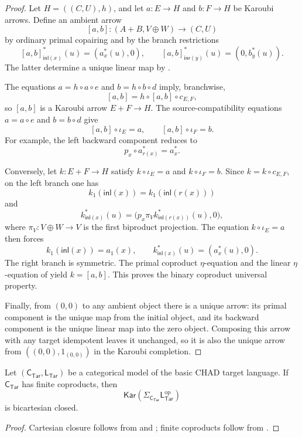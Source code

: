 \documentclass[runningheads,envcountsame]{llncs}
\newcommand{\Tar}{\mathsf{Tar}}
\newcommand{\CTar}{\mathsf C_{\Tar}}
\newcommand{\LTar}{\mathsf L_{\Tar}}
\newcommand{\Kar}{\mathsf{Kar}}
\begin{document}
\begin{proof}
Let $H=((C,U),h)$, and let $a:E\to H$ and $b:F\to H$ be Karoubi arrows.
Define an ambient arrow
$$
[a,b]:(A+B,V\oplus W)\longrightarrow(C,U)
$$
by ordinary primal copairing and by the branch restrictions
$$
[a,b]^*_{\mathsf{inl}(x)}(u)=(a_x^*(u),0),
\qquad
[a,b]^*_{\mathsf{inr}(y)}(u)=(0,b_y^*(u)).
$$
The latter determine a unique linear map by
.

The equations $a=h\circ a\circ e$ and $b=h\circ b\circ d$ imply,
branchwise,
$$
[a,b]=h\circ[a,b]\circ c_{E,F},
$$
so $[a,b]$ is a Karoubi arrow $E+F\to H$. The source-compatibility equations
$a=a\circ e$ and $b=b\circ d$ give
$$
[a,b]\circ\iota_E=a,
\qquad
[a,b]\circ\iota_F=b.
$$
For example, the left backward component reduces to
$$
p_x\circ a^*_{r(x)}=a_x^*.
$$

Conversely, let $k:E+F\to H$ satisfy
$k\circ\iota_E=a$ and $k\circ\iota_F=b$. Since
$k=k\circ c_{E,F}$, on the left branch one has
$$
k_1(\mathsf{inl}(x))
=
k_1(\mathsf{inl}(r(x)))
$$
and
$$
k^*_{\mathsf{inl}(x)}(u)
=
\bigl(p_x\pi_Vk^*_{\mathsf{inl}(r(x))}(u),0\bigr),
$$
where $\pi_V:V\oplus W\to V$ is the first biproduct projection. The
equation $k\circ\iota_E=a$ then forces
$$
k_1(\mathsf{inl}(x))=a_1(x),
\qquad
k^*_{\mathsf{inl}(x)}(u)=(a_x^*(u),0).
$$
The right branch is symmetric. The primal coproduct $\eta$-equation and the
linear $\eta$-equation of  yield
$k=[a,b]$. This proves the binary coproduct universal property.

Finally, from $(0,0)$ to any ambient object there is a unique arrow: its primal
component is the unique map from the initial object, and its backward component
is the unique linear map into the zero object. Composing this arrow with any
target idempotent leaves it unchanged, so it is also the unique arrow from
$((0,0),1_{(0,0)})$ in the Karoubi completion.
\end{proof}

\begin{corollary}
\label{cor:target-bcc-app}
Let $(\CTar,\LTar)$ be a categorical model of the basic CHAD target language.
If $\CTar$ has finite coproducts, then
$$
\Kar\left(\Sigma_{\CTar}\LTar^{\mathrm{op}}\right)
$$
is bicartesian closed.
\end{corollary}

\begin{proof}
Cartesian closure follows from \cite[Theorem~6.2]{VakarSmeding2022} and
; finite coproducts follow from
.
\end{proof}
\end{document}
